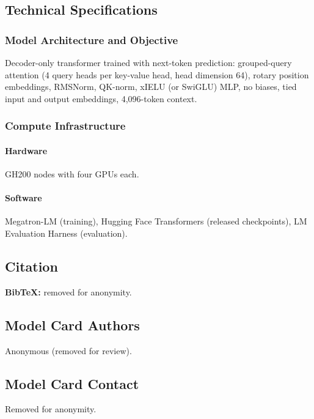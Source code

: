 \subsection*{Technical Specifications}

\subsubsection*{Model Architecture and Objective}

Decoder-only transformer trained with next-token prediction: grouped-query attention (4 query heads per key-value head, head dimension 64), rotary position embeddings, RMSNorm, QK-norm, xIELU (or SwiGLU) MLP, no biases, tied input and output embeddings, 4,096-token context.

\subsubsection*{Compute Infrastructure}

\paragraph{Hardware}

GH200 nodes with four GPUs each.

\paragraph{Software}

Megatron-LM (training), Hugging Face Transformers (released checkpoints), LM Evaluation Harness (evaluation).

\subsection*{Citation}

\textbf{BibTeX:} removed for anonymity.

\subsection*{Model Card Authors}

Anonymous (removed for review).

\subsection*{Model Card Contact}

Removed for anonymity.
